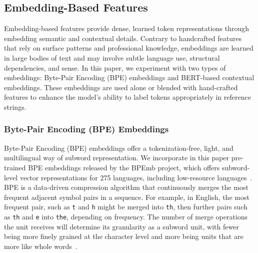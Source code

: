 \subsection{Embedding-Based Features}
Embedding-based features provide dense, learned token representations through embedding semantic and contextual details. Contrary to handcrafted features that rely on surface patterns and professional knowledge, embeddings are learned in large bodies of text and may involve subtle language use, structural dependencies, and sense. In this paper, we experiment with two types of embeddings: Byte-Pair Encoding (BPE) embeddings and BERT-based contextual embeddings. These embeddings are used alone or blended with hand-crafted features to enhance the model's ability to label tokens appropriately in reference strings.

\subsubsection{Byte-Pair Encoding (BPE) Embeddings}
Byte-Pair Encoding (BPE) embeddings offer a tokenization-free, light, and multilingual way of subword representation. We incorporate in this paper pre-trained BPE embeddings released by the BPEmb project, which offers subword-level vector representations for 275 languages, including low-resource languages~\cite{bpemb}.
BPE is a data-driven compression algorithm that continuously merges the most frequent adjacent symbol pairs in a sequence. For example, in English, the most frequent pair, such as \texttt{t} and \texttt{h} might be merged into \texttt{th}, then further pairs such as \texttt{th} and \texttt{e} into \texttt{the}, depending on frequency. The number of merge operations the unit receives will determine its granularity as a subword unit, with fewer being more finely grained at the character level and more being units that are more like whole words~\cite{bpemb}.

